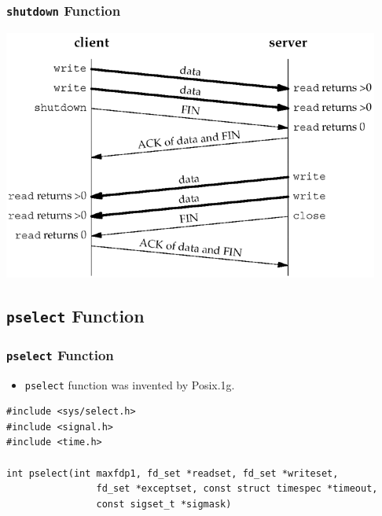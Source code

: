 \documentclass[notes,serif]{beamer}
\begin{document}
\begin{frame}
\frametitle{\texttt{shutdown} Function}
 \begin{center}
  \includegraphics[width=.7\textwidth]{figs/06fig12.png}
  \end{center}
\end{frame}

\subsection{\texttt{pselect} Function}
\begin{frame}[containsverbatim]
\frametitle{\texttt{pselect} Function}
\begin{itemize}
  \item \texttt{pselect} function was invented by Posix.1g.
\end{itemize}
{\scriptsize
\begin{verbatim}
#include <sys/select.h>
#include <signal.h>
#include <time.h>

int pselect(int maxfdp1, fd_set *readset, fd_set *writeset,
                fd_set *exceptset, const struct timespec *timeout,
                const sigset_t *sigmask)

\end{verbatim}
}
\end{frame}
\end{document}
